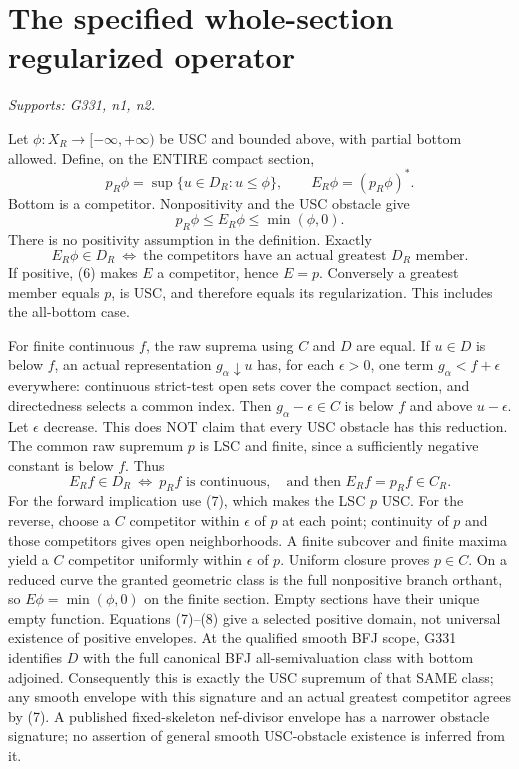 \documentclass[11pt]{article}
\begin{document}
\section{The specified whole-section regularized operator}
\textit{Supports: G331, n1, n2.}

Let $\phi:X_R\to[-\infty,+\infty)$ be USC and bounded above, with partial bottom allowed. Define, on the ENTIRE compact section,
\[
p_R\phi=\sup\{u\in D_R:u\le\phi\},\qquad E_R\phi=(p_R\phi)^*.
\]
Bottom is a competitor. Nonpositivity and the USC obstacle give
\[
p_R\phi\le E_R\phi\le\min(\phi,0).                    \tag{6}
\]
There is no positivity assumption in the definition. Exactly
\[
E_R\phi\in D_R\ \Longleftrightarrow\ \text{the competitors have an actual greatest }D_R\text{ member}. \tag{7}
\]
If positive, (6) makes $E$ a competitor, hence $E=p$. Conversely a greatest member equals $p$, is USC, and therefore equals its regularization. This includes the all-bottom case.

For finite continuous $f$, the raw suprema using $C$ and $D$ are equal. If $u\in D$ is below $f$, an actual representation $g_\alpha\downarrow u$ has, for each $\epsilon>0$, one term $g_\alpha<f+\epsilon$ everywhere: continuous strict-test open sets cover the compact section, and directedness selects a common index. Then $g_\alpha-\epsilon\in C$ is below $f$ and above $u-\epsilon$. Let $\epsilon$ decrease. This does NOT claim that every USC obstacle has this reduction. The common raw supremum $p$ is LSC and finite, since a sufficiently negative constant is below $f$. Thus
\[
E_Rf\in D_R\ \Longleftrightarrow\ p_Rf\text{ is continuous},
\quad\text{and then } E_Rf=p_Rf\in C_R.                \tag{8}
\]
For the forward implication use (7), which makes the LSC $p$ USC. For the reverse, choose a $C$ competitor within $\epsilon$ of $p$ at each point; continuity of $p$ and those competitors gives open neighborhoods. A finite subcover and finite maxima yield a $C$ competitor uniformly within $\epsilon$ of $p$. Uniform closure proves $p\in C$. On a reduced curve the granted geometric class is the full nonpositive branch orthant, so $E\phi=\min(\phi,0)$ on the finite section. Empty sections have their unique empty function. Equations (7)--(8) give a selected positive domain, not universal existence of positive envelopes. At the qualified smooth BFJ scope, G331 identifies $D$ with the full canonical BFJ all-semivaluation class with bottom adjoined. Consequently this is exactly the USC supremum of that SAME class; any smooth envelope with this signature and an actual greatest competitor agrees by (7). A published fixed-skeleton nef-divisor envelope has a narrower obstacle signature; no assertion of general smooth USC-obstacle existence is inferred from it.
\end{document}
